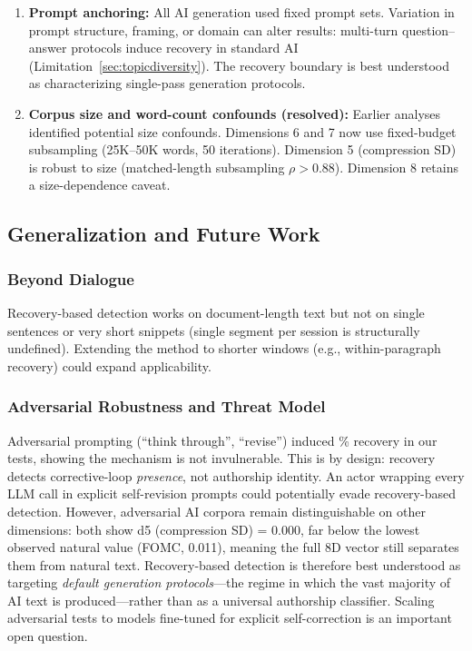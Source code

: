 \documentclass[11pt]{article}
\begin{document}
\begin{enumerate}
\item \textbf{Prompt anchoring:} All AI generation used fixed prompt sets. Variation in prompt structure, framing, or domain can alter results: multi-turn question--answer protocols induce recovery in standard AI (Limitation~\ref{sec:topicdiversity}). The recovery boundary is best understood as characterizing single-pass generation protocols.

\item \textbf{Corpus size and word-count confounds (resolved):} Earlier analyses identified potential size confounds. Dimensions 6 and 7 now use fixed-budget subsampling (25K--50K words, 50 iterations). Dimension 5 (compression SD) is robust to size (matched-length subsampling $\rho > 0.88$). Dimension 8 retains a size-dependence caveat.

\end{enumerate}

\subsection{Generalization and Future Work}

\subsubsection{Beyond Dialogue}

Recovery-based detection works on document-length text but not on single sentences or very short snippets (single segment per session is structurally undefined). Extending the method to shorter windows (e.g., within-paragraph recovery) could expand applicability.

\subsubsection{Adversarial Robustness and Threat Model}

Adversarial prompting (``think through'', ``revise'') induced \recAdversarial\% recovery in our tests, showing the mechanism is not invulnerable. This is by design: recovery detects corrective-loop \textit{presence}, not authorship identity. An actor wrapping every LLM call in explicit self-revision prompts could potentially evade recovery-based detection. However, adversarial AI corpora remain distinguishable on other dimensions: both show d5 (compression SD) = 0.000, far below the lowest observed natural value (FOMC, 0.011), meaning the full 8D vector still separates them from natural text. Recovery-based detection is therefore best understood as targeting \textit{default generation protocols}---the regime in which the vast majority of AI text is produced---rather than as a universal authorship classifier. Scaling adversarial tests to models fine-tuned for explicit self-correction is an important open question.
\end{document}
